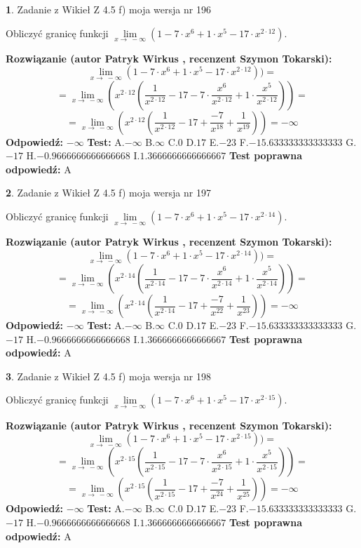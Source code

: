 \documentclass[12pt, a4paper]{article}
\theoremstyle{definition} %
\newtheorem{zad}{}
\newcommand{\zadStart}[1]{\begin{zad}#1\newline}
\newcommand{\zadStop}{\end{zad}}
\newcommand{\rozwStart}[2]{\noindent \textbf{Rozwiązanie (autor #1 , recenzent #2): }\newline}
\newcommand{\rozwStop}{\newline}
\newcommand{\odpStart}{\noindent \textbf{Odpowiedź:}\newline}
\newcommand{\odpStop}{\newline}
\newcommand{\testStart}{\noindent \textbf{Test:}\newline}
\newcommand{\testStop}{\newline}
\newcommand{\kluczStart}{\noindent \textbf{Test poprawna odpowiedź:}\newline}
\newcommand{\kluczStop}{\newline}
\begin{document}
\zadStart{Zadanie z Wikieł Z 4.5 f) moja wersja nr 196}


Obliczyć granicę funkcji  $\lim\limits_{x\to\ -\infty}(1 - 7 \cdot x^{6}+1 \cdot x^{5}- 17 \cdot x^{2\cdot12})$.
\zadStop
\rozwStart{Patryk Wirkus}{Szymon Tokarski}
$$\lim\limits_{x\to\ -\infty}(1 - 7 \cdot x^{6}+1 \cdot x^{5}- 17 \cdot x^{2\cdot12}))=$$
$$=\lim\limits_{x\to\ -\infty}(x^{2\cdot12}(\frac{1}{x^{2\cdot12}}-17 -7 \cdot \frac{x^{6}}{x^{2\cdot12}}+1 \cdot \frac{x^{5}}{x^{2\cdot12}}))=$$
$$=\lim\limits_{x\to\ -\infty}(x^{2\cdot12}(\frac{1}{x^{2\cdot12}}-17 + \frac{-7}{x^{18}}+ \frac{1}{x^{19}}))=-\infty$$
\rozwStop
\odpStart
$-\infty$
\odpStop
\testStart
A.$-\infty$ B.$\infty$ C.$0$ D.$17$ E.$-23$
F.$-15.633333333333333$ G.$-17$
H.$-0.9666666666666668$
I.$1.3666666666666667$
\testStop
\kluczStart
A
\kluczStop



\zadStart{Zadanie z Wikieł Z 4.5 f) moja wersja nr 197}


Obliczyć granicę funkcji  $\lim\limits_{x\to\ -\infty}(1 - 7 \cdot x^{6}+1 \cdot x^{5}- 17 \cdot x^{2\cdot14})$.
\zadStop
\rozwStart{Patryk Wirkus}{Szymon Tokarski}
$$\lim\limits_{x\to\ -\infty}(1 - 7 \cdot x^{6}+1 \cdot x^{5}- 17 \cdot x^{2\cdot14}))=$$
$$=\lim\limits_{x\to\ -\infty}(x^{2\cdot14}(\frac{1}{x^{2\cdot14}}-17 -7 \cdot \frac{x^{6}}{x^{2\cdot14}}+1 \cdot \frac{x^{5}}{x^{2\cdot14}}))=$$
$$=\lim\limits_{x\to\ -\infty}(x^{2\cdot14}(\frac{1}{x^{2\cdot14}}-17 + \frac{-7}{x^{22}}+ \frac{1}{x^{23}}))=-\infty$$
\rozwStop
\odpStart
$-\infty$
\odpStop
\testStart
A.$-\infty$ B.$\infty$ C.$0$ D.$17$ E.$-23$
F.$-15.633333333333333$ G.$-17$
H.$-0.9666666666666668$
I.$1.3666666666666667$
\testStop
\kluczStart
A
\kluczStop



\zadStart{Zadanie z Wikieł Z 4.5 f) moja wersja nr 198}


Obliczyć granicę funkcji  $\lim\limits_{x\to\ -\infty}(1 - 7 \cdot x^{6}+1 \cdot x^{5}- 17 \cdot x^{2\cdot15})$.
\zadStop
\rozwStart{Patryk Wirkus}{Szymon Tokarski}
$$\lim\limits_{x\to\ -\infty}(1 - 7 \cdot x^{6}+1 \cdot x^{5}- 17 \cdot x^{2\cdot15}))=$$
$$=\lim\limits_{x\to\ -\infty}(x^{2\cdot15}(\frac{1}{x^{2\cdot15}}-17 -7 \cdot \frac{x^{6}}{x^{2\cdot15}}+1 \cdot \frac{x^{5}}{x^{2\cdot15}}))=$$
$$=\lim\limits_{x\to\ -\infty}(x^{2\cdot15}(\frac{1}{x^{2\cdot15}}-17 + \frac{-7}{x^{24}}+ \frac{1}{x^{25}}))=-\infty$$
\rozwStop
\odpStart
$-\infty$
\odpStop
\testStart
A.$-\infty$ B.$\infty$ C.$0$ D.$17$ E.$-23$
F.$-15.633333333333333$ G.$-17$
H.$-0.9666666666666668$
I.$1.3666666666666667$
\testStop
\kluczStart
A
\kluczStop
\end{document}
